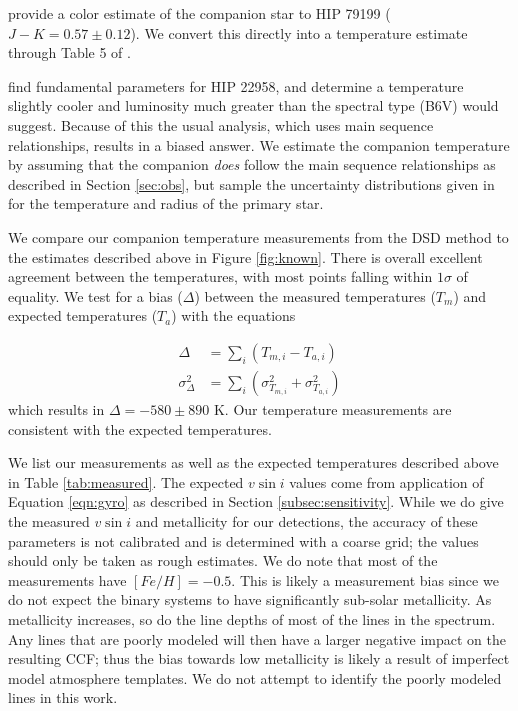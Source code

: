 \documentclass{emulateapj}
\begin{document}
\citet{Shatsky2002} provide a color estimate of the companion star to HIP 79199 ($J-K = 0.57 \pm 0.12$). We convert this directly into a temperature estimate through Table 5 of \citet{Pecaut2013}.

\citet{Zorec2012} find fundamental parameters for HIP 22958, and determine a temperature slightly cooler and luminosity much greater than the spectral type (B6V) would suggest. Because of this the usual analysis, which uses main sequence relationships, results in a biased answer. We estimate the companion temperature by assuming that the companion \emph{does} follow the main sequence relationships as described in Section \ref{sec:obs}, but sample the uncertainty distributions given in \citet{Zorec2012} for the temperature and radius of the primary star.

We compare our companion temperature measurements from the DSD method to the estimates described above in Figure \ref{fig:known}. There is overall excellent agreement between the temperatures, with most points falling within $1 \sigma$ of equality. We test for a bias ($\Delta$) between the measured temperatures ($T_m$) and expected temperatures ($T_a$) with the equations

\begin{eqnarray}
\Delta &= \sum_i(T_{m,i} - T_{a,i}) \\
\sigma_{\Delta}^2 &= \sum_i (\sigma_{T_{m,i}}^2 + \sigma_{T_{a,i}}^2)
\end{eqnarray}
which results in $\Delta = -580 \pm 890$ K. Our temperature measurements are consistent with the expected temperatures.

We list our measurements as well as the expected temperatures described above in Table \ref{tab:measured}. The expected $v\sin{i}$ values come from application of Equation \ref{eqn:gyro} as described in Section \ref{subsec:sensitivity}. While we do give the measured $v\sin{i}$ and metallicity for our detections, the accuracy of these parameters is not calibrated and is determined with a coarse grid; the values should only be taken as rough estimates. We do note that most of the measurements have $[Fe/H] = -0.5$. This is likely a measurement bias since we do not expect the binary systems to have significantly sub-solar metallicity. As metallicity increases, so do the line depths of most of the lines in the spectrum. Any lines that are poorly modeled will then have a larger negative impact on the resulting CCF; thus the bias towards low metallicity is likely a result of imperfect model atmosphere templates. We do not attempt to identify the poorly modeled lines in this work.
\end{document}
